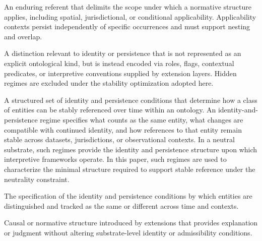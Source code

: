 
\begin{description}[style=nextline,leftmargin=1.5cm]

  \item[Applicability Context]
        An enduring referent that delimits the scope under which a
        normative structure applies, including spatial, jurisdictional,
        or conditional applicability.
        Applicability contexts persist independently of specific occurrences
        and must support nesting and overlap.

  \item[Hidden Regime]
        A distinction relevant to identity or persistence that is not represented
        as an explicit ontological kind,
        but is instead encoded via roles, flags, contextual predicates,
        or interpretive conventions supplied by extension layers.
        Hidden regimes are excluded under the stability optimization adopted here.

  \item[Identity-and-Persistence Regime]
        A structured set of identity and persistence conditions
        that determine how a class of entities can be stably referenced
        over time within an ontology.
        An identity-and-persistence regime specifies what counts as the same entity,
        what changes are compatible with continued identity, and
        how references to that entity remain stable across
        datasets, jurisdictions, or observational contexts.
        In a neutral substrate, such regimes provide the identity
        and persistence structure upon which interpretive frameworks operate.
        In this paper, such regimes are used to characterize the minimal
        structure required to support stable reference under the neutrality
        constraint.

  \item[Individuation]
        The specification of the identity and persistence conditions
        by which entities are distinguished and tracked as the same or different
        across time and contexts.

  \item[Interpretive Extension]
        Causal or normative structure introduced by extensions that
        provides explanation or judgment without altering substrate-level
        identity or admissibility conditions.


\end{description}
